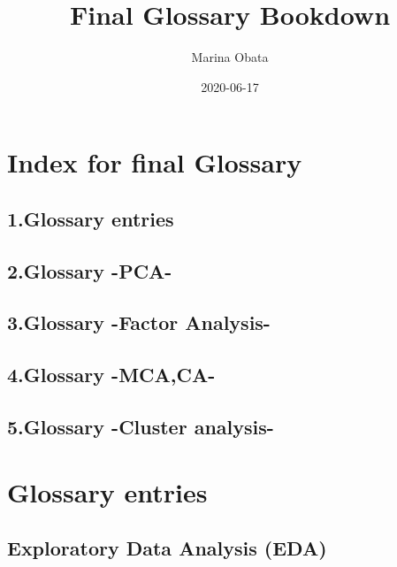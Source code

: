 \documentclass[]{book}
\title{Final Glossary Bookdown}
\author{Marina Obata}
\date{2020-06-17}
\begin{document}
\maketitle

{
\setcounter{tocdepth}{1}
\tableofcontents
}
\hypertarget{index-for-final-glossary}{%
\chapter{Index for final Glossary}\label{index-for-final-glossary}}

\hypertarget{glossary-entries}{%
\section{1.Glossary entries}\label{glossary-entries}}

\hypertarget{glossary--pca-}{%
\section{2.Glossary -PCA-}\label{glossary--pca-}}

\hypertarget{glossary--factor-analysis-}{%
\section{3.Glossary -Factor Analysis-}\label{glossary--factor-analysis-}}

\hypertarget{glossary--mcaca-}{%
\section{4.Glossary -MCA,CA-}\label{glossary--mcaca-}}

\hypertarget{glossary--cluster-analysis-}{%
\section{5.Glossary -Cluster analysis-}\label{glossary--cluster-analysis-}}

\hypertarget{glossary-entries-1}{%
\chapter{Glossary entries}\label{glossary-entries-1}}

\hypertarget{exploratory-data-analysis-eda}{%
\section{Exploratory Data Analysis (EDA)}\label{exploratory-data-analysis-eda}}
\end{document}
